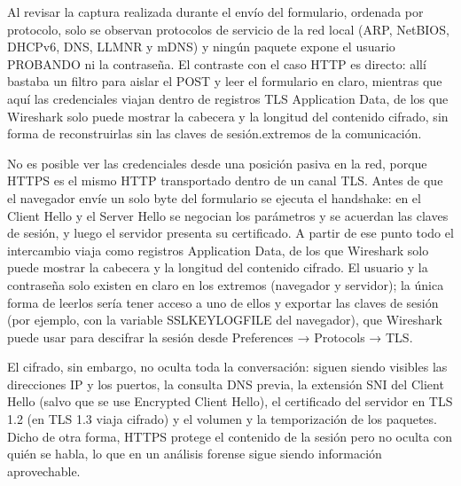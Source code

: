 
\begin{analisis}
Al revisar la captura realizada durante el envío del formulario, ordenada por protocolo, solo se observan protocolos de servicio de la red local (ARP, NetBIOS, DHCPv6, DNS, LLMNR y mDNS) y ningún paquete expone el usuario PROBANDO ni la contraseña. El contraste con el caso HTTP es directo: allí bastaba un filtro para aislar el POST y leer el formulario en claro, mientras que aquí las credenciales viajan dentro de registros TLS Application Data, de los que Wireshark solo puede mostrar la cabecera y la longitud del contenido cifrado, sin forma de reconstruirlas sin las claves de sesión.extremos de la comunicación.
\end{analisis}

\begin{respuesta}
No es posible ver las credenciales desde una posición pasiva en la red, porque HTTPS es el mismo HTTP transportado dentro de un canal TLS. Antes de que el navegador envíe un solo byte del formulario se ejecuta el handshake: en el Client Hello y el Server Hello se negocian los parámetros y se acuerdan las claves de sesión, y luego el servidor presenta su certificado. A partir de ese punto todo el intercambio viaja como registros Application Data, de los que Wireshark solo puede mostrar la cabecera y la longitud del contenido cifrado. El usuario y la contraseña solo existen en claro en los extremos (navegador y servidor); la única forma de leerlos sería tener acceso a uno de ellos y exportar las claves de sesión (por ejemplo, con la variable SSLKEYLOGFILE del navegador), que Wireshark puede usar para descifrar la sesión desde Preferences → Protocols → TLS.


El cifrado, sin embargo, no oculta toda la conversación: siguen siendo visibles las direcciones IP y los puertos, la consulta DNS previa, la extensión SNI del Client Hello (salvo que se use Encrypted Client Hello), el certificado del servidor en TLS 1.2 (en TLS 1.3 viaja cifrado) y el volumen y la temporización de los paquetes. Dicho de otra forma, HTTPS protege el contenido de la sesión pero no oculta con quién se habla, lo que en un análisis forense sigue siendo información aprovechable.



\end{respuesta}

